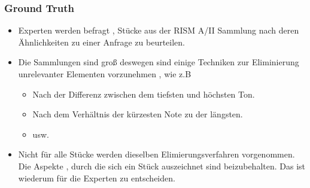 \documentclass{beamer}
\begin{document}
		\begin{frame}
			\frametitle{Ground Truth}
			\begin{itemize}
				\item Experten werden befragt , Stücke aus der RISM A/II Sammlung  nach deren Ähnlichkeiten zu einer Anfrage zu beurteilen.
				\item Die Sammlungen sind groß deswegen sind einige Techniken zur Eliminierung unrelevanter Elementen vorzunehmen , wie z.B
					\begin{itemize}
						\item Nach der Differenz zwischen dem tiefsten und höchsten Ton.
						\item Nach dem Verhältnis der kürzesten Note zu der längsten.
						\item usw.
					\end{itemize}
				\item Nicht für alle Stücke werden dieselben Elimierungsverfahren vorgenommen. Die Aspekte , durch die sich ein Stück auszeichnet sind beizubehalten. Das ist wiederum für die Experten zu entscheiden.
			\end{itemize}
		\end{frame}
\end{document}
